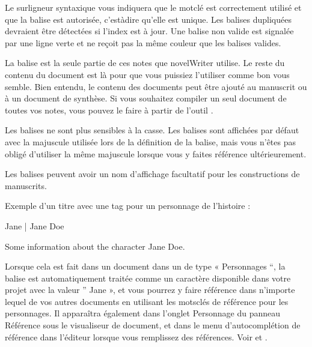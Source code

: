 \documentclass[a4paper,11pt,french]{sphinxmanual}
\begin{document}
\sphinxAtStartPar
Le surligneur syntaxique vous indiquera que le mot\sphinxhyphen{}clé est correctement utilisé et que la balise est autorisée, c’est\sphinxhyphen{}à\sphinxhyphen{}dire qu’elle est unique. Les balises dupliquées devraient être détectées si l’index est à jour. Une balise non valide est signalée par une ligne verte et ne reçoit pas la même couleur que les balises valides.

\sphinxAtStartPar
La balise est la seule partie de ces notes que novelWriter utilise. Le reste du contenu du document est là pour que vous puissiez l’utiliser comme bon vous semble. Bien entendu, le contenu des documents peut être ajouté au manuscrit ou à un document de synthèse. Si vous souhaitez compiler un seul document de toutes vos notes, vous pouvez le faire à partir de l’outil .

\sphinxAtStartPar
{}Les balises ne sont plus sensibles à la casse. Les balises sont affichées par défaut avec la majuscule utilisée lors de la définition de la balise, mais vous n’êtes pas obligé d’utiliser la même majuscule lorsque vous y faites référence ultérieurement.

\sphinxAtStartPar
{}Les balises peuvent avoir un nom d’affichage facultatif pour les constructions de manuscrits.

\sphinxAtStartPar
Exemple d’un titre avec une tag pour un personnage de l’histoire :

\begin{sphinxVerbatim}[commandchars=\\\{\}]

 Jane | Jane Doe

Some information about the character Jane Doe.
\end{sphinxVerbatim}

\sphinxAtStartPar
Lorsque cela est fait dans un document dans un {\hyperref[\detokenize{int_glossary:term-Root-Folder}]{}} de type « Personnages “, la balise est automatiquement traitée comme un caractère disponible dans votre projet avec la valeur ” Jane », et vous pourrez y faire référence dans n’importe lequel de vos autres documents en utilisant les mots\sphinxhyphen{}clés de référence pour les personnages. Il apparaîtra également dans l’onglet Personnage du panneau Référence sous le visualiseur de document, et dans le menu d’auto\sphinxhyphen{}complétion de référence dans l’éditeur lorsque vous remplissez des références. Voir {\hyperref[\detokenize{usage_writing:a-ui-view}]{}} et {\hyperref[\detokenize{project_references:a-references-completer}]{}}.
\end{document}
